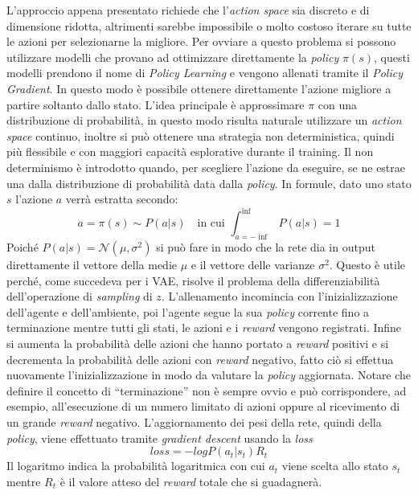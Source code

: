 L'approccio appena presentato richiede che l'\emph{action space} sia discreto e di dimensione ridotta, altrimenti sarebbe impossibile o molto costoso iterare su tutte le azioni per selezionarne la migliore.
Per ovviare a questo problema si possono utilizzare modelli che provano ad ottimizzare direttamente la \emph{policy} $\pi(s)$, questi modelli prendono il nome di \emph{Policy Learning} e vengono allenati tramite il \emph{Policy Gradient}. %
In questo modo è possibile ottenere direttamente l'azione migliore a partire soltanto dallo stato.
L'idea principale è approssimare $\pi$ con una distribuzione di probabilità, in questo modo risulta naturale utilizzare un \emph{action space} continuo, inoltre si può ottenere una strategia non deterministica, quindi più flessibile e con maggiori capacità esplorative durante il training.
Il non determinismo è introdotto quando, per scegliere l'azione da eseguire, se ne estrae una dalla distribuzione di probabilità data dalla \emph{policy}.
In formule, dato uno stato $s$ l'azione $a$ verrà estratta secondo:
$$
a = 
\pi(s) \sim P(a|s) \quad\textrm{in cui } \int_{a = - \inf}^{\inf} P(a | s) = 1
$$
Poiché $P(a|s)  = \mathcal{N}(\mu,\sigma ^2)$ si può fare in modo che la rete dia in output direttamente il vettore della medie $\mu$ e il vettore delle varianze $\sigma^2$.
Questo è utile perché, come succedeva per i VAE, risolve il problema della differenziabilità dell'operazione di \emph{sampling} di $z$.
L'allenamento incomincia con l'inizializzazione dell'agente e dell'ambiente, poi l'agente segue la sua \emph{policy} corrente fino a terminazione mentre tutti gli stati, le azioni e i \emph{reward} vengono registrati.
Infine si aumenta la probabilità delle azioni che hanno portato a \emph{reward} positivi e si decrementa la probabilità delle azioni con \emph{reward} negativo, fatto ciò si effettua nuovamente l'inizializzazione in modo da valutare la \emph{policy} aggiornata. 
Notare che definire il concetto di ``terminazione'' non è sempre ovvio e può corrispondere, ad esempio, all'esecuzione di un numero limitato di azioni oppure al ricevimento di un grande \emph{reward} negativo.
L'aggiornamento dei pesi della rete, quindi della \emph{policy}, viene effettuato tramite \emph{gradient descent} usando la \emph{loss}
$$
loss = - log P(a_t | s_t ) R_t
$$
Il logaritmo indica la probabilità logaritmica con cui $a_t$ viene scelta allo stato $s_t$ mentre $R_t$ è il valore atteso del \emph{reward} totale che si guadagnerà.
